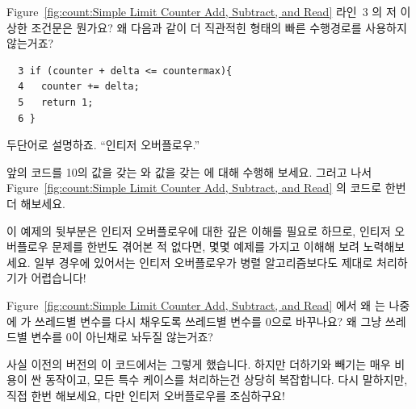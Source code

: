 \begin{enumerate}
\QuickQ{}
	Figure~\ref{fig:count:Simple Limit Counter Add, Subtract, and Read}
	라인~3 의 저 이상한 조건문은 뭔가요?
	왜 다음과 같이 더 직관적힌 형태의 빠른 수행경로를 사용하지 않는거죠?

	\vspace{5pt}
	\begin{minipage}[t]{\columnwidth}
	\small
	\begin{verbatim}
  3 if (counter + delta <= countermax){
  4   counter += delta;
  5   return 1;
  6 }
	\end{verbatim}
	\end{minipage}
	\vspace{5pt}
\QuickA{}
	두단어로 설명하죠.
	``인티저 오버플로우.''

	앞의 코드를 10의 값을 갖는  와  값을 갖는
	 에 대해 수행해 보세요.
	그러고 나서
	Figure~\ref{fig:count:Simple Limit Counter Add, Subtract, and Read} 의
	코드로 한번 더 해보세요.

	이 예제의 뒷부분은 인티저 오버플로우에 대한 깊은 이해를 필요로 하므로,
	인티저 오버플로우 문제를 한번도 겪어본 적 없다면, 몇몇 예제를 가지고
	이해해 보려 노력해보세요.
	일부 경우에 있어서는 인티저 오버플로우가 병렬 알고리즘보다도 제대로
	처리하기가 어렵습니다!

\QuickQ{}
	Figure~\ref{fig:count:Simple Limit Counter Add, Subtract, and Read}
	에서 왜  는 나중에  가
	쓰레드별 변수를 다시 채우도록 쓰레드별 변수를 0으로 바꾸나요?
	왜 그냥 쓰레드별 변수를 0이 아닌채로 놔두질 않는거죠?

\QuickA{}
	사실 이전의 버전의 이 코드에서는 그렇게 했습니다.
	하지만 더하기와 빼기는 매우 비용이 싼 동작이고, 모든 특수 케이스를
	처리하는건 상당히 복잡합니다.
	다시 말하지만, 직접 한번 해보세요, 다만 인티저 오버플로우를 조심하구요!
	\iffalse


\end{enumerate}
